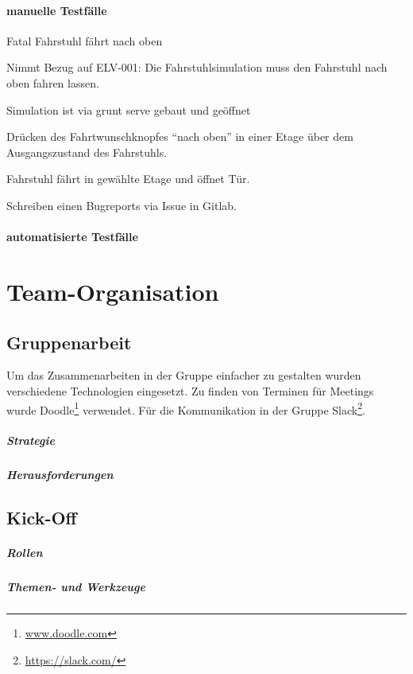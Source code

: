 \subsubsection{manuelle Testfälle}
\begin{testcase}{Fatal}
\tcSubject Fahrstuhl fährt nach oben

\tcRemark Nimmt Bezug auf ELV-001: Die Fahrstuhlsimulation muss den Fahrstuhl nach oben fahren lassen.

\tcConditions Simulation ist via grunt serve gebaut und geöffnet

\tcProceeding Drücken des Fahrtwunschknopfes "`nach oben"' in einer Etage über dem Ausgangszustand des Fahrstuhls.

\tcGoal Fahrstuhl fährt in gewählte Etage und öffnet Tür.

\tcError Schreiben einen Bugreports via Issue in Gitlab.
\end{testcase}
\subsubsection{automatisierte Testfälle}

\chapter{Team-Organisation}
\section{Gruppenarbeit}
Um das Zusammenarbeiten in der Gruppe einfacher zu gestalten wurden verschiedene Technologien eingesetzt.
Zu finden von Terminen für Meetings wurde Doodle\footnote{\url{www.doodle.com}}  verwendet. Für die Kommunikation in der Gruppe Slack\footnote{\url{https://slack.com/}}.
\paragraph{Strategie}
\paragraph{Herausforderungen}
\section{Kick-Off}
\paragraph{Rollen}
\paragraph{Themen- und Werkzeuge}
